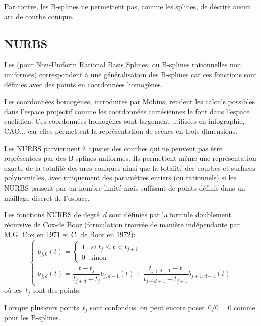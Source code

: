 Par contre, les B-splines ne permettent pas, comme les splines, de décrire aucun arc de courbe conique.


\medskip
\subsection{NURBS}

Les  (pour Non-Uniform Rational Basis Splines, ou B-splines rationnelles non 
uniformes) correspondent à une généralisation des B-splines car ces fonctions sont définies 
avec des points en coordonnées homogènes.

Les coordonnées homogènes, introduites par Möbius, 
rendent les calculs possibles dans l'espace 
projectif comme les coordonnées cartésiennes le font dans l'espace euclidien.
Ces coordonnées homogènes sont largement utilisées en infographie, CAO... car elles permettent
la représentation de scènes en trois dimensions.

Les NURBS parviennent à ajuster des courbes qui ne peuvent pas être représentées par des B-splines 
uniformes. Ils permettent même une représentation exacte de la totalité des arcs coniques
ainsi que la totalité des courbes et surfaces polynomiales, avec uniquement des paramètres entiers 
(ou rationnels) si les NURBS passent par un nombre limité mais suffisant de points définis dans un maillage 
discret de l'espace.

\medskip
Les fonctions NURBS de degré~$d$ sont définies par la formule doublement récursive de Cox-de Boor 
(formulation trouvée de manière indépendante par M.G. Cox en 1971 et C. de Boor en 1972):
\begin{equation}
  \left\{\begin{array}{ll}b_{j,0}(t)= \left\{ \begin{array}{ll} 1 & si\; t_j \leq t < t_{j+1} \\ 0 & \text{sinon} \end{array} \right.\\ 
b_{j,d}(t)= \dfrac{t-t_j}{t_{j+d}-t_j} b_{j,d-1}(t)+\dfrac{t_{j+d+1}-t}{t_{j+d+1}-t_{j+1}}b_{j+1,d-1}(t)\end{array}\right.
\end{equation}
où les~$t_j$ sont des points.

Lorsque plusieurs points~$t_j$ sont confondus, on peut encore poser~$0/0=0$ comme pour les B-splines.


